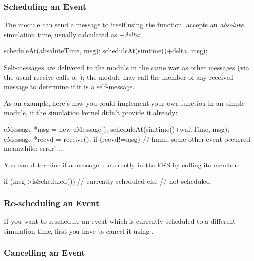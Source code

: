 \subsubsection{Scheduling an Event}

The module can send a message to itself using the  function.
 accepts an \textit{absolute} simulation time,
usually calculated as +\textit{delta}:

\begin{cpp}
scheduleAt(absoluteTime, msg);
scheduleAt(simtime()+delta, msg);
\end{cpp}

Self-messages are delivered to the module in the same way as other
messages (via the usual receive calls or );
the module may call the  member of any received
message to determine if it is a self-message.

As an example, here's how you could implement your own 
function in an  simple module, if the simulation kernel
didn't provide it already:

%
%

\begin{cpp}
cMessage *msg = new cMessage();
scheduleAt(simtime()+waitTime, msg);
cMessage *recvd = receive();
if (recvd!=msg)
   // hmm, some other event occurred meanwhile: error!
...
\end{cpp}

You can determine if a message is currently in the FES
by calling its  member:

\begin{cpp}
if (msg->isScheduled())
  // currently scheduled
else
  // not scheduled
\end{cpp}


\subsubsection{Re-scheduling an Event}

If you want to reschedule an event which is currently scheduled to a different
simulation time, first you have to cancel it using .


\subsubsection{Cancelling an Event}

